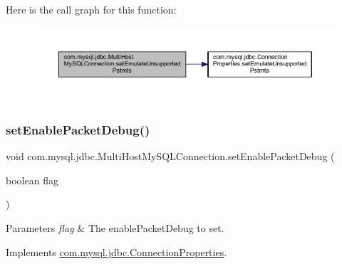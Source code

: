 Here is the call graph for this function\+:
\nopagebreak
\begin{figure}[H]
\begin{center}
\leavevmode
\includegraphics[width=350pt]{classcom_1_1mysql_1_1jdbc_1_1_multi_host_my_s_q_l_connection_a7c475a0b1f3d339fa0bab4863ac31609_cgraph}
\end{center}
\end{figure}
\mbox{\label{classcom_1_1mysql_1_1jdbc_1_1_multi_host_my_s_q_l_connection_a08ebf87d3511967776a8f2047453f72b}} 
\subsubsection{\texorpdfstring{set\+Enable\+Packet\+Debug()}{setEnablePacketDebug()}}
{\footnotesize\ttfamily void com.\+mysql.\+jdbc.\+Multi\+Host\+My\+S\+Q\+L\+Connection.\+set\+Enable\+Packet\+Debug (\begin{DoxyParamCaption}\item[{boolean}]{flag }\end{DoxyParamCaption})}


\begin{DoxyParams}{Parameters}
{\em flag} & The enable\+Packet\+Debug to set. \\
\hline
\end{DoxyParams}


Implements \mbox{\hyperlink{interfacecom_1_1mysql_1_1jdbc_1_1_connection_properties_a544989b319bc9a8c941c8c969011fcb5}{com.\+mysql.\+jdbc.\+Connection\+Properties}}.

